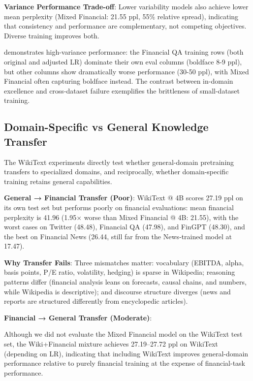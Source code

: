 \textbf{Variance Performance Trade-off}: Lower variability models also achieve lower mean perplexity (Mixed Financial: 21.55 ppl, 55\% relative spread), indicating that consistency and performance are complementary, not competing objectives. Diverse training improves both.



 demonstrates high-variance performance: the Financial QA training rows (both original and adjusted LR) dominate their own eval columns (boldface 8-9 ppl), but other columns show dramatically worse performance (30-50 ppl), with Mixed Financial often capturing boldface instead. The contrast between in-domain excellence and cross-dataset failure exemplifies the brittleness of small-dataset training.

\subsection{Domain-Specific vs General Knowledge Transfer}

The WikiText experiments directly test whether general-domain pretraining transfers to specialized domains, and reciprocally, whether domain-specific training retains general capabilities.

\textbf{General → Financial Transfer (Poor)}: WikiText @ 4B scores 27.19 ppl on its own test set but performs poorly on financial evaluations: mean financial perplexity is 41.96 (1.95$\times$ worse than Mixed Financial @ 4B: 21.55), with the worst cases on Twitter (48.48), Financial QA (47.98), and FinGPT (48.30), and the best on Financial News (26.44, still far from the News‑trained model at 17.47).

\textbf{Why Transfer Fails}: Three mismatches matter: vocabulary (EBITDA, alpha, basis points, P/E ratio, volatility, hedging) is sparse in Wikipedia; reasoning patterns differ (financial analysis leans on forecasts, causal chains, and numbers, while Wikipedia is descriptive); and discourse structure diverges (news and reports are structured differently from encyclopedic articles).

\textbf{Financial → General Transfer (Moderate)}:

Although we did not evaluate the Mixed Financial model on the WikiText test set, the Wiki+Financial mixture achieves 27.19–27.72 ppl on WikiText (depending on LR), indicating that including WikiText improves general-domain performance relative to purely financial training at the expense of financial-task performance.

